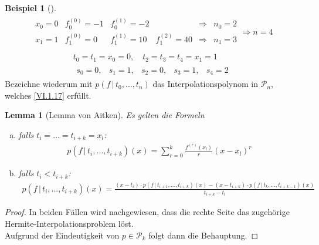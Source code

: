 \documentclass[ngerman,fontsize=11pt, paper=a4, parskip=half, titlepage=true, toc=bib]{scrbook}
\theoremstyle{definition}
\newtheorem{Bsp}[Def]{Beispiel}
\theoremstyle{plain}
\newtheorem{Lem}[Def]{Lemma}		%
\newenvironment{Leme}[1][]{ %
  \begin{Lem}[#1] }
  {\end{Lem}
  	\addtocounter{subsection}{1}}
\newenvironment{Bspe}[1][]{ %
  \begin{Bsp}[#1]}
  {\end{Bsp}
  	\addtocounter{subsection}{1}}
\begin{document}
\begin{Bspe}\label{VI.1.13}
  \begin{align*}
     \begin{array}{ccccrc}
       x_0=0 & f_0^{(0)} = -1 & f_0^{(1)}= -2 
       && \Rightarrow & n_0=2 \\
       x_1=1 & f_1^{(0)} = 0 &  f_1^{(1)}= 10 & f_1^{(2)}=40               
                      &\Rightarrow & n_1=3 \\
     \end{array}\Longrightarrow n=4 
\end{align*}
\begin{gather*}
    t_0 = t_1 =x_0=0, \quad t_2=t_3=t_4=x_1=1 \\
     \begin{array}{ccccc}
       s_0=0, & s_1=1, & s_2=0, & s_3=1, & s_4=2
     \end{array}
   \end{gather*}
Bezeichne wiederum mit $p(f\,| \, t_0,\dots, t_n)$
das Interpolationspolynom in $\mathcal{P}_n$,
welches \eqref{VI.1.17} erfüllt.
\end{Bspe}

\begin{Leme}[Lemma von Aitken]
\label{6.1.14}
Es gelten die Formeln
\begin{enumerate}[a)]
\item falls $t_i=\dots = t_{i+k}=x_l$:
  \begin{gather}
    p(f\,|\, t_i,\dots, t_{i+k})(x) 
    = \sum_{r=0}^{k}\frac{f^{(r)}(x_l)}{r}(x-x_l)^r
    \label{VI.1.19}
  \end{gather}
\item falls $t_i<t_{i+k} $:
  \begin{gather}
    p(f\,|\, t_i,\dots, t_{i+k})(x) 
    = \frac{(x-t_i)\cdot p(f\,|\, t_{i+1},\dots, t_{i+k})(x)
            - (x-t_{i+k})\cdot p(f\,|\,t_k,\dots, t_{i+k-1})(x)}
          {t_{i+k}-t_i}
    \label{VI.1.20}
  \end{gather}
\end{enumerate}
\end{Leme}

\begin{proof}
In beiden Fällen wird nachgewiesen, dass die rechte Seite
das zugehörige Hermite-Interpolationsproblem löst.\\
Aufgrund der Eindeutigkeit von $p\in\mathcal{P}_k$
 folgt dann die Behauptung.
\end{proof}
\end{document}
